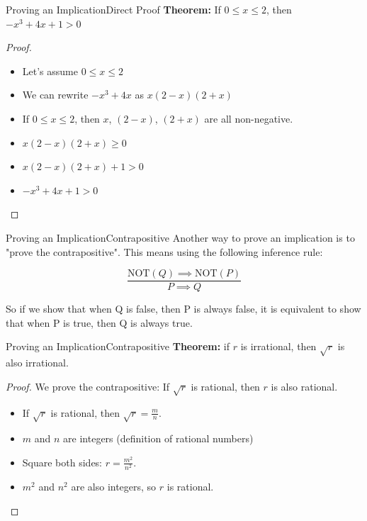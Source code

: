 \begin{frame}{Proving an Implication}{Direct Proof}
{\bf Theorem:} If $0 \leq x \leq 2$, then $-x^3 + 4x + 1 > 0$\bigskip

\begin{proof}
\begin{itemize}
  \item Let's assume $0 \leq x \leq 2$
  \item We can rewrite $-x^3 + 4x$ as $x(2-x)(2+x)$
  \item If $0 \leq x \leq 2$, then $x$, $(2-x)$, $(2+x)$ are all non-negative.
  \item $x(2-x)(2+x) \geq 0$
  \item $x(2-x)(2+x) + 1 > 0$
  \item $-x^3 + 4x + 1 > 0$
\end{itemize}
\end{proof}

\end{frame}

\begin{frame}{Proving an Implication}{Contrapositive}
  Another way to prove an implication is to "prove the contrapositive". This means using the following inference rule:

  \[
    \frac{\text{NOT}(Q) \implies \text{NOT}(P)}{P \implies Q}
  \]

  So if we show that when Q is false, then P is always false, it is equivalent to show that when P is true, then Q is always true.
\end{frame}

\begin{frame}{Proving an Implication}{Contrapositive}
  {\bf Theorem:} if $r$ is irrational, then $\sqrt{r}$ is also irrational.

  \begin{proof}
    We prove the contrapositive: If $\sqrt{r}$ is rational, then $r$ is also rational.
    \begin{itemize}
      \item If $\sqrt{r}$ is rational, then $\sqrt{r}=\frac{m}{n}$.
      \item $m$ and $n$ are integers (definition of rational numbers)
      \item Square both sides: $r = \frac{m^2}{n^2}$.
      \item $m^2$ and $n^2$ are also integers, so $r$ is rational.
    \end{itemize}
  \end{proof}
\end{frame}



